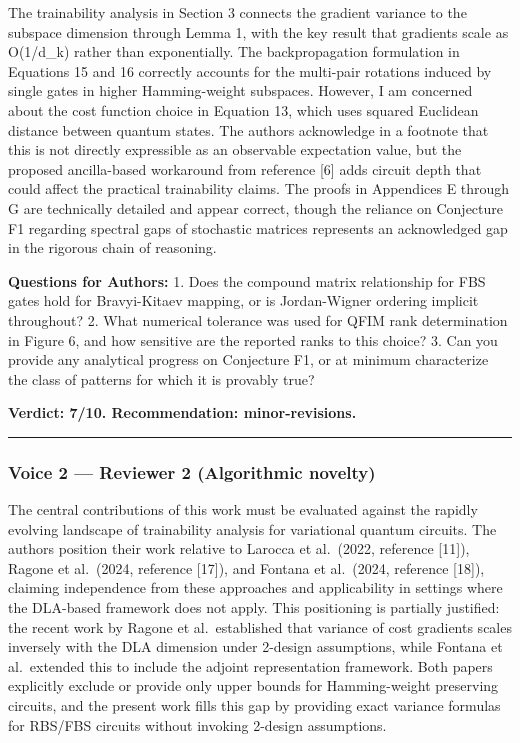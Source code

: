 \documentclass[10pt,letterpaper]{article}
\begin{document}
The trainability analysis in Section 3 connects the gradient variance to the subspace dimension through Lemma 1, with the key result that gradients scale as O(1/d\_k) rather than exponentially. The backpropagation formulation in Equations 15 and 16 correctly accounts for the multi-pair rotations induced by single gates in higher Hamming-weight subspaces. However, I am concerned about the cost function choice in Equation 13, which uses squared Euclidean distance between quantum states. The authors acknowledge in a footnote that this is not directly expressible as an observable expectation value, but the proposed ancilla-based workaround from reference {[}6{]} adds circuit depth that could affect the practical trainability claims. The proofs in Appendices E through G are technically detailed and appear correct, though the reliance on Conjecture F1 regarding spectral gaps of stochastic matrices represents an acknowledged gap in the rigorous chain of reasoning.

\textbf{Questions for Authors:}
1. Does the compound matrix relationship for FBS gates hold for Bravyi-Kitaev mapping, or is Jordan-Wigner ordering implicit throughout?
2. What numerical tolerance was used for QFIM rank determination in Figure 6, and how sensitive are the reported ranks to this choice?
3. Can you provide any analytical progress on Conjecture F1, or at minimum characterize the class of patterns for which it is provably true?

\textbf{Verdict: 7/10. Recommendation: minor-revisions.}

\begin{center}\rule{0.5\linewidth}{0.5pt}\end{center}

\hypertarget{voice-2-reviewer-2-algorithmic-novelty}{%
\subsubsection{Voice 2 --- Reviewer 2 (Algorithmic novelty)}\label{voice-2-reviewer-2-algorithmic-novelty}}

The central contributions of this work must be evaluated against the rapidly evolving landscape of trainability analysis for variational quantum circuits. The authors position their work relative to Larocca et al.~(2022, reference {[}11{]}), Ragone et al.~(2024, reference {[}17{]}), and Fontana et al.~(2024, reference {[}18{]}), claiming independence from these approaches and applicability in settings where the DLA-based framework does not apply. This positioning is partially justified: the recent work by Ragone et al.~established that variance of cost gradients scales inversely with the DLA dimension under 2-design assumptions, while Fontana et al.~extended this to include the adjoint representation framework. Both papers explicitly exclude or provide only upper bounds for Hamming-weight preserving circuits, and the present work fills this gap by providing exact variance formulas for RBS/FBS circuits without invoking 2-design assumptions.
\end{document}
